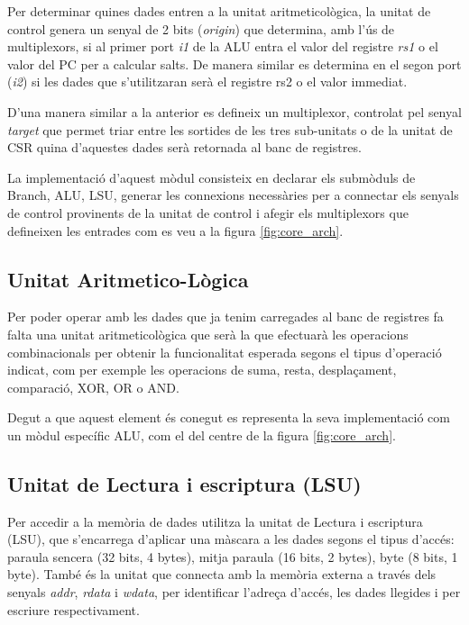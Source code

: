 \documentclass[10pt,a4paper,twocolumn,twoside]{article}
\begin{document}
    Per determinar quines dades entren a la unitat aritmeticològica, la unitat de control genera un senyal de 2 bits (\textit{origin}) que determina, amb l'ús de multiplexors, si al primer port \textit{i1} de la ALU entra el valor del registre \textit{rs1} o el valor del PC per a calcular salts. De manera similar es determina en el segon port (\textit{i2}) si les dades que s'utilitzaran serà el registre rs2 o el valor immediat.
    
    D'una manera similar a la anterior es defineix un multiplexor, controlat pel senyal \textit{target} que permet triar entre les sortides de les tres sub-unitats o de la unitat de CSR quina d'aquestes dades serà retornada al banc de registres.
    
    La implementació d'aquest mòdul consisteix en declarar els submòduls de Branch, ALU, LSU, generar les connexions necessàries per a connectar els senyals de control provinents de la unitat de control i afegir els multiplexors que defineixen les entrades com es veu a la figura \ref{fig:core_arch}. 

    

    
    
    \subsection{Unitat Aritmetico-Lògica}
    Per poder operar amb les dades que ja tenim carregades al banc de registres fa falta una unitat aritmeticològica que serà la que efectuarà les operacions combinacionals per obtenir la funcionalitat esperada segons el tipus d'operació indicat, com per exemple  les operacions de suma, resta, desplaçament, comparació, XOR, OR o AND.
    
    Degut a que aquest element és conegut es representa la seva implementació com un mòdul específic ALU, com el del centre de la figura \ref{fig:core_arch}.

    
    \subsection{Unitat de Lectura i escriptura (LSU)}
    
    Per accedir a la memòria de dades utilitza la unitat de Lectura i escriptura (LSU), que s'encarrega d'aplicar una màscara a les dades segons el tipus d'accés: paraula sencera (32 bits, 4 bytes), mitja paraula (16 bits, 2 bytes), byte (8 bits, 1 byte). També és la unitat que connecta amb la memòria externa a través dels senyals \textit{addr}, \textit{rdata} i \textit{wdata}, per identificar l'adreça d'accés, les dades llegides i per escriure respectivament.
    
\end{document}
